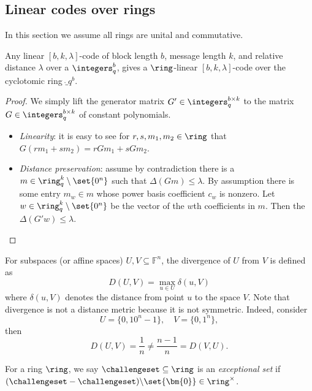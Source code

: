 \subsection{Linear codes over rings}
\label{sec:ring-codes}

In this section we assume all rings are unital and commutative.


\begin{lemma}
Any linear $[b,k,\lambda]$-code of block length $b$, message length $k$, and relative distance $\lambda$ over a $\integers^{b}_{q}$, gives a $\ring$-linear $[b,k,\lambda]$-code over the cyclotomic ring $\ring_{q}^{b}$.
\end{lemma}

\begin{proof}
We simply lift the generator matrix $G' \in \integers_{q}^{b \times k}$ to the matrix $G \in \integers_{q}^{b \times k}$ of constant polynomials.
\begin{itemize}[nosep]
    \item \emph{Linearity}: it is easy to see for $r,s,m_1,m_2 \in \ring$ that $G(r m_1 + s m_2) = rGm_1 +sGm_2$.
    \item \emph{Distance preservation}: assume by contradiction there is a $m \in \ring_{q}^{k}\setminus\set{0^n}$ such that $\Delta(Gm) \le \lambda$. By assumption there is some entry $m_{w} \in m$ whose power basis coefficient $c_w$ is nonzero. Let $w \in \ring_{q}^{k}\setminus\set{0^n}$ be the vector of the $w$th coefficients in $m$. Then the $\Delta(G'w) \leq \lambda$.
\end{itemize}
\end{proof}

\begin{definition}
For subspaces (or affine spaces) $U, V \subseteq \mathbb{F}^n$, the divergence of $U$ from $V$ is defined as
\[
D(U, V) = \max_{u \in U} \delta(u, V)
\]
where $\delta(u, V)$ denotes the distance from point $u$ to the space $V$. Note that divergence is not a distance metric because it is not symmetric. Indeed, consider 
\[
U = \{0, 10^n - 1\},\quad V = \{0, 1^n\},
\]
then
\[
D(U, V) = \frac{1}{n} \neq \frac{n - 1}{n} = D(V, U).
\]
\end{definition}

\begin{definition}
  \label{def:exceptional-set}
    For a ring $\ring$, we say $\challengeset \subseteq \ring$ is an \emph{exceptional set} if $(\challengeset-\challengeset){\setminus}\set{\bm{0}} \in \ring^{\times}$.
\end{definition}

